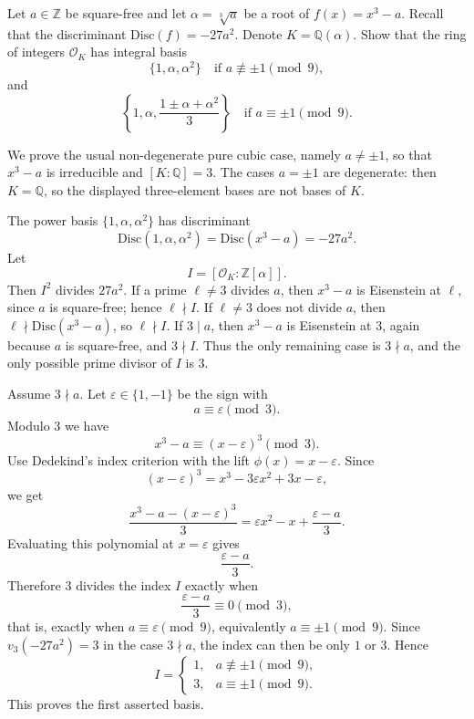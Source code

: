 \begin{exercise}
\label{algebra:2026:4}
Let $a\in \mathbb{Z}$ be square-free and let $\alpha=\sqrt[3]{a}$ be a root of $f(x)=x^3-a$. Recall that the discriminant $\mathrm{Disc}(f)=-27a^2$. Denote $K=\mathbb{Q}(\alpha)$. Show that the ring of integers $\mathcal{O}_K$ has integral basis
\[
\{1,\alpha,\alpha^2\}
\quad\text{if }a\not\equiv \pm 1\pmod 9,
\]
and
\[
\left\{1,\alpha,\frac{1\pm \alpha+\alpha^2}{3}\right\}
\quad\text{if }a\equiv \pm 1\pmod 9.
\]
\end{exercise}

\begin{solution}
We prove the usual non-degenerate pure cubic case, namely $a\ne \pm 1$, so that $x^3-a$ is irreducible and $[K:\mathbb{Q}]=3$. The cases $a=\pm 1$ are degenerate: then $K=\mathbb{Q}$, so the displayed three-element bases are not bases of $K$.

The power basis $\{1,\alpha,\alpha^2\}$ has discriminant
\[
\mathrm{Disc}(1,\alpha,\alpha^2)=\mathrm{Disc}(x^3-a)=-27a^2.
\]
Let
\[
I=[\mathcal{O}_K:\mathbb{Z}[\alpha]].
\]
Then $I^2$ divides $27a^2$. If a prime $\ell\neq 3$ divides $a$, then $x^3-a$ is Eisenstein at $\ell$, since $a$ is square-free; hence $\ell\nmid I$. If $\ell\neq 3$ does not divide $a$, then $\ell\nmid \mathrm{Disc}(x^3-a)$, so $\ell\nmid I$. If $3\mid a$, then $x^3-a$ is Eisenstein at $3$, again because $a$ is square-free, and $3\nmid I$. Thus the only remaining case is $3\nmid a$, and the only possible prime divisor of $I$ is $3$.

Assume $3\nmid a$. Let $\varepsilon\in\{1,-1\}$ be the sign with
\[
a\equiv \varepsilon\pmod 3.
\]
Modulo $3$ we have
\[
x^3-a\equiv (x-\varepsilon)^3\pmod 3.
\]
Use Dedekind's index criterion with the lift $\phi(x)=x-\varepsilon$. Since
\[
(x-\varepsilon)^3=x^3-3\varepsilon x^2+3x-\varepsilon,
\]
we get
\[
\frac{x^3-a-(x-\varepsilon)^3}{3}
=
\varepsilon x^2-x+\frac{\varepsilon-a}{3}.
\]
Evaluating this polynomial at $x=\varepsilon$ gives
\[
\frac{\varepsilon-a}{3}.
\]
Therefore $3$ divides the index $I$ exactly when
\[
\frac{\varepsilon-a}{3}\equiv 0\pmod 3,
\]
that is, exactly when $a\equiv \varepsilon\pmod 9$, equivalently $a\equiv \pm 1\pmod 9$. Since $v_3(-27a^2)=3$ in the case $3\nmid a$, the index can then be only $1$ or $3$. Hence
\[
I=
\begin{cases}
1, & a\not\equiv \pm 1\pmod 9,\\
3, & a\equiv \pm 1\pmod 9.
\end{cases}
\]
This proves the first asserted basis.


\end{solution}
